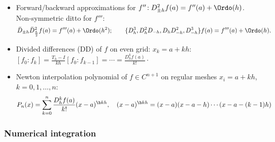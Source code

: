 \documentclass[a4paper]{article}
\begin{document}
\begin{itemize}
  \item Forward/backward approximations for
    $f''\!: D_{\pm h}^2f(a) = f''(a) + \Ordo(h)$.
    Non-symmetric ditto for $f'''$:
    \[
       \bar D_{\pm h}\bar D_{\frac h2}^2 f(a)
     = f'''(a) + \Ordo(h^2);
     \qquad
     \{
       D_h^3,
       D_h^2D_{-h},
       D_hD_{-h}^2,
       D_{-h}^3
     \}f(a)
     =
     f'''(a) + \Ordo(h).
    \]

  \item Divided differences (DD)
    of $f$ on even grid: $x_k=a+kh$:
    $
    [f_0\!:\!f_k]
    =
     \frac{T_h-I}{kh}[f_0\!:\!f_{k-1}]
     = \cdots
     =\frac{D_h^kf(a)}{k!}
     \cdot
    $

  \item Newton interpolation polynomial
    of $f\in C^{n+1}$ on regular meshes $x_i=a+kh$,
    $k=0,1,\ldots,n$:
    \[
      P_n(x)
      = \sum_{k=0}^n
         \frac{D_h^kf(a)}{k!}
        (x-a)^{\scriptsize\b kh},
        \quad
        (x-a)^{\scriptsize\b kh}
         = (x-a)(x-a-h)\cdots(x-a-(k-1)h)
    \]

\end{itemize}%

\subsubsection*{Numerical integration}%
\end{document}
